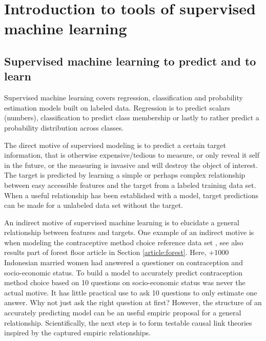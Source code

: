 \chapter{Introduction to tools of supervised machine learning}
\label{chap_introStat}

\section{Supervised machine learning to predict and to learn}
Supervised machine learning covers regression, classification and probability estimation models built on labeled data. Regression is to predict scalars (numbers), classification to predict class membership or lastly to rather predict a probability distribution across classes. 

The direct motive of supervised modeling is to predict a certain target information, that is otherwise expensive/tedious to measure, or only reveal it self in the future, or the measuring is invasive and will destroy the object of interest. The target is predicted by learning a simple or perhaps complex relationship between easy accessible features and the target from a labeled training data set. When a useful relationship has been established with a model, target predictions can be made for a unlabeled data set without the target.

An indirect motive of supervised machine learning is to elucidate a general relationship between features and targets. One example of an indirect motive is when modeling the contraceptive method choice reference data set \cite{lichman2013uci}, see also results part of forest floor article in Section \ref{article:forest}. Here, +1000 Indonesian married women had answered a questioner on contraception and socio-economic status. To build a model to accurately predict contraception method choice based on 10 questions on socio-economic status was never the actual motive. It has little practical use to ask 10 questions to only estimate one answer. Why not just ask the right question at first? However, the structure of an accurately predicting model can be an useful empiric proposal for a general relationship. Scientifically, the next step is to form testable causal link theories inspired by the captured empiric relationships. 


